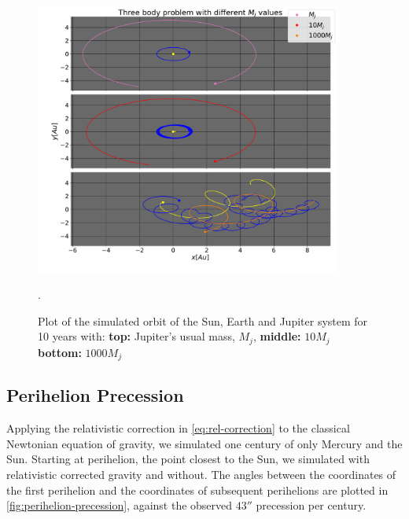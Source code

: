 \documentclass[../main.tex]{subfiles}
\begin{document}
\begin{figure}[htb!]
    \centering
    \includegraphics[width=0.9\textwidth]{../figures/three_body_problem.pdf}
    \caption{Plot of the simulated orbit of the Sun, Earth and Jupiter system for 10 years with: \textbf{top:} Jupiter's usual mass, $M_j$, \textbf{middle:} $10M_j$ \textbf{bottom:} $1000M_j$}.
    \label{fig:three-body-problem}
\end{figure}


\subsection{Perihelion Precession}

Applying the relativistic correction in \cref{eq:rel-correction} to the classical Newtonian equation of gravity, we simulated one century of only Mercury and the Sun. Starting at perihelion, the point closest to the Sun, we simulated with relativistic corrected gravity and without. The angles between the coordinates of the first perihelion and the coordinates of subsequent perihelions are plotted in \cref{fig:perihelion-precession}, against the observed $43''$ precession per century.
\end{document}
